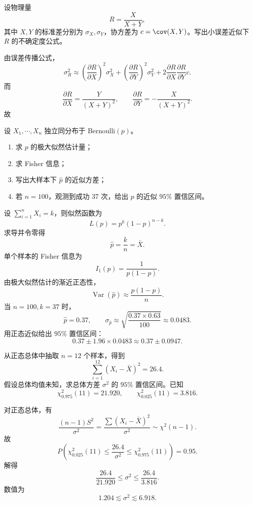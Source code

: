 ﻿

\begin{question}
设物理量
\[
R=\frac{X}{X+Y},
\]
其中 $X,Y$ 的标准差分别为 $\sigma_X,\sigma_Y$，协方差为 $c=\cov(X,Y)$。写出小误差近似下 $R$ 的不确定度公式。
\begin{solution}
由误差传播公式，
\[
\sigma_R^2\approx
\left(\frac{\partial R}{\partial X}\right)^2\sigma_X^2+
\left(\frac{\partial R}{\partial Y}\right)^2\sigma_Y^2+
2\frac{\partial R}{\partial X}\frac{\partial R}{\partial Y}c.
\]
而
\[
\frac{\partial R}{\partial X}=\frac{Y}{(X+Y)^2},
\qquad
\frac{\partial R}{\partial Y}=-\frac{X}{(X+Y)^2}.
\]
故
\end{solution}
\end{question}

\begin{question}
设 $X_1,\cdots,X_n$ 独立同分布于 Bernoulli$(p)$。
\begin{enumerate}
\item 求 $p$ 的极大似然估计量；
\item 求 Fisher 信息；
\item 写出大样本下 $\hat p$ 的近似方差；
\item 若 $n=100$，观测到成功 $37$ 次，给出 $p$ 的近似 $95\%$ 置信区间。
\end{enumerate}
\begin{solution}
设 $\sum_{i=1}^n X_i=k$，则似然函数为
\[
L(p)=p^k(1-p)^{n-k}.
\]
求导并令零得
\[
\hat p=\frac{k}{n}=\bar X.
\]
单个样本的 Fisher 信息为
\[
I_1(p)=\frac{1}{p(1-p)}.
\]
由极大似然估计的渐近正态性，
\[
\operatorname{Var}(\hat p)\approx \frac{p(1-p)}{n}.
\]
当 $n=100,k=37$ 时，
\[
\hat p=0.37,
\qquad
\sigma_{\hat p}\approx \sqrt{\frac{0.37\times 0.63}{100}}\approx 0.0483.
\]
用正态近似给出 $95\%$ 置信区间：
\[
0.37\pm 1.96\times 0.0483
\approx 0.37\pm 0.0947.
\]
\end{solution}
\end{question}

\begin{question}
从正态总体中抽取 $n=12$ 个样本，得到
\[
\sum_{i=1}^{12}(X_i-\bar X)^2=26.4.
\]
假设总体均值未知，求总体方差 $\sigma^2$ 的 $95\%$ 置信区间。已知
\[
\chi^2_{0.975}(11)=21.920,
\qquad
\chi^2_{0.025}(11)=3.816.
\]
\begin{solution}
对正态总体，有
\[
\frac{(n-1)S^2}{\sigma^2}=\frac{\sum (X_i-\bar X)^2}{\sigma^2}\sim \chi^2(n-1).
\]
故
\[
P\left(\chi^2_{0.025}(11)\le \frac{26.4}{\sigma^2}\le \chi^2_{0.975}(11)\right)=0.95.
\]
解得
\[
\frac{26.4}{21.920}\le \sigma^2\le \frac{26.4}{3.816}.
\]
数值为
\[
1.204\lesssim \sigma^2\lesssim 6.918.
\]
\end{solution}
\end{question}

